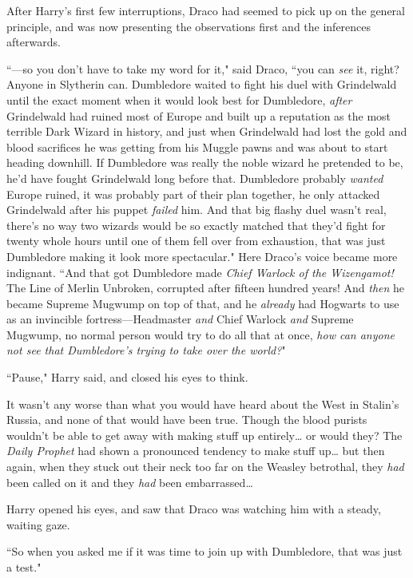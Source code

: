After Harry's first few interruptions, Draco had seemed to pick up on the general principle, and was now presenting the observations first and the inferences afterwards.

``—so you don't have to take my word for it," said Draco, ``you can \emph{see} it, right? Anyone in Slytherin can. Dumbledore waited to fight his duel with Grindelwald until the exact moment when it would look best for Dumbledore, \emph{after} Grindelwald had ruined most of Europe and built up a reputation as the most terrible Dark Wizard in history, and just when Grindelwald had lost the gold and blood sacrifices he was getting from his Muggle pawns and was about to start heading downhill. If Dumbledore was really the noble wizard he pretended to be, he'd have fought Grindelwald long before that. Dumbledore probably \emph{wanted} Europe ruined, it was probably part of their plan together, he only attacked Grindelwald after his puppet \emph{failed} him. And that big flashy duel wasn't real, there's no way two wizards would be so exactly matched that they'd fight for twenty whole hours until one of them fell over from exhaustion, that was just Dumbledore making it look more spectacular." Here Draco's voice became more indignant. ``And that got Dumbledore made \emph{Chief Warlock of the Wizengamot!} The Line of Merlin Unbroken, corrupted after fifteen hundred years! And \emph{then} he became Supreme Mugwump on top of that, and he \emph{already} had Hogwarts to use as an invincible fortress—Headmaster \emph{and} Chief Warlock \emph{and} Supreme Mugwump, no normal person would try to do all that at once, \emph{how can anyone not see that Dumbledore's trying to take over the world?}"

``Pause," Harry said, and closed his eyes to think.

It wasn't any worse than what you would have heard about the West in Stalin's Russia, and none of that would have been true. Though the blood purists wouldn't be able to get away with making stuff up entirely{\ldots} or would they? The \emph{Daily Prophet} had shown a pronounced tendency to make stuff up{\ldots} but then again, when they stuck out their neck too far on the Weasley betrothal, they \emph{had} been called on it and they \emph{had} been embarrassed{\ldots}

Harry opened his eyes, and saw that Draco was watching him with a steady, waiting gaze.

``So when you asked me if it was time to join up with Dumbledore, that was just a test."

